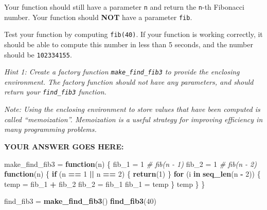 \documentclass[
]{article}
\newenvironment{Shaded}{\begin{snugshade}}{\end{snugshade}}
\newcommand{\CommentTok}[1]{\textcolor[rgb]{0.56,0.35,0.01}{\textit{#1}}}
\newcommand{\ControlFlowTok}[1]{\textcolor[rgb]{0.13,0.29,0.53}{\textbf{#1}}}
\newcommand{\DecValTok}[1]{\textcolor[rgb]{0.00,0.00,0.81}{#1}}
\newcommand{\KeywordTok}[1]{\textcolor[rgb]{0.13,0.29,0.53}{\textbf{#1}}}
\newcommand{\NormalTok}[1]{#1}
\newcommand{\OperatorTok}[1]{\textcolor[rgb]{0.81,0.36,0.00}{\textbf{#1}}}
\newcommand{\StringTok}[1]{\textcolor[rgb]{0.31,0.60,0.02}{#1}}
\begin{document}
Your function should still have a parameter \texttt{n} and return the
\texttt{n}-th Fibonacci number. Your function should \textbf{NOT} have a
parameter \texttt{fib}.

Test your function by computing \texttt{fib(40)}. If your function is
working correctly, it should be able to compute this number in less than
5 seconds, and the number should be \texttt{102334155}.

\emph{Hint 1: Create a factory function \texttt{make\_find\_fib3} to
provide the enclosing environment. The factory function should not have
any parameters, and should return your \texttt{find\_fib3} function.}

\emph{Note: Using the enclosing environment to store values that have
been computed is called ``memoization''. Memoization is a useful
strategy for improving efficiency in many programming problems.}

\textbf{YOUR ANSWER GOES HERE:}

\begin{Shaded}
\begin{Highlighting}[]
\NormalTok{make\_find\_fib3 =}\StringTok{ }\ControlFlowTok{function}\NormalTok{(n) \{}
\NormalTok{   fib\_}\DecValTok{1}\NormalTok{ =}\StringTok{ }\DecValTok{1}   \CommentTok{\# fib(n {-} 1)}
\NormalTok{   fib\_}\DecValTok{2}\NormalTok{ =}\StringTok{ }\DecValTok{1}   \CommentTok{\# fib(n {-} 2)}
   \ControlFlowTok{function}\NormalTok{(n) \{}
      \ControlFlowTok{if}\NormalTok{ (n }\OperatorTok{==}\StringTok{ }\DecValTok{1} \OperatorTok{||}\StringTok{ }\NormalTok{n }\OperatorTok{==}\StringTok{ }\DecValTok{2}\NormalTok{) \{}
         \KeywordTok{return}\NormalTok{(}\DecValTok{1}\NormalTok{)}
\NormalTok{      \}}
      \ControlFlowTok{for}\NormalTok{ (i }\ControlFlowTok{in} \KeywordTok{seq\_len}\NormalTok{(n }\OperatorTok{{-}}\StringTok{ }\DecValTok{2}\NormalTok{)) \{}
\NormalTok{         temp =}\StringTok{ }\NormalTok{fib\_}\DecValTok{1} \OperatorTok{+}\StringTok{ }\NormalTok{fib\_}\DecValTok{2}
\NormalTok{         fib\_}\DecValTok{2}\NormalTok{ =}\StringTok{ }\NormalTok{fib\_}\DecValTok{1}
\NormalTok{         fib\_}\DecValTok{1}\NormalTok{ =}\StringTok{ }\NormalTok{temp}
\NormalTok{      \}}
\NormalTok{      temp}
\NormalTok{   \}}
\NormalTok{\}}

\NormalTok{find\_fib3 =}\StringTok{ }\KeywordTok{make\_find\_fib3}\NormalTok{()}
\KeywordTok{find\_fib3}\NormalTok{(}\DecValTok{40}\NormalTok{)}
\end{Highlighting}
\end{Shaded}
\end{document}
